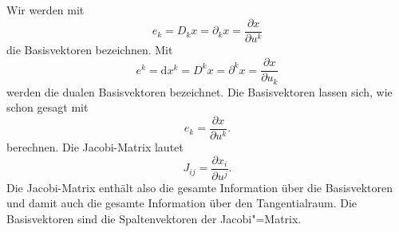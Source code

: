 \documentclass[a4paper,10pt,fleqn,twocolumn,twoside]{article}
\numberwithin{equation}{section}
\begin{document}
Wir werden mit
\begin{equation}
e_k = D_kx = \partial_kx = \frac{\partial x}{\partial u^k}
\end{equation}
die Basisvektoren bezeichnen. Mit
\begin{equation}
e^k = \mathrm dx^k = D^kx = \partial^kx = \frac{\partial x}{\partial u_k}
\end{equation}
werden die dualen Basisvektoren bezeichnet. Die Basisvektoren lassen
sich, wie schon gesagt mit
\begin{equation}
e_k = \frac{\partial x}{\partial u^k}.
\end{equation}
berechnen. Die Jacobi-Matrix lautet
\begin{equation}
J_{ij} = \frac{\partial x_i}{\partial u^j}.
\end{equation}
Die Jacobi-Matrix enthält also die gesamte Information über die
Basisvektoren und damit auch die gesamte Information über den
Tangentialraum. Die Basisvektoren sind die Spaltenvektoren der
Jacobi"=Matrix.
\end{document}
